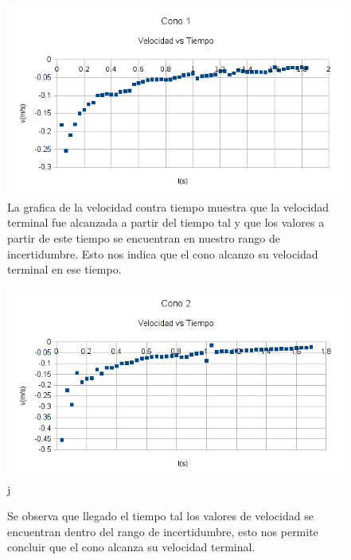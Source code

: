 \begin{figure}[h!]
    \centering
    \includegraphics{vel_cono1}
    \caption{La grafica de la velocidad contra tiempo muestra que la velocidad terminal
	fue alcanzada a partir del tiempo tal y que los valores a partir de este
	tiempo se encuentran en nuestro rango de incertidumbre. Esto nos indica que el
	cono alcanzo su velocidad terminal en ese tiempo.}
    \label{fig:VelCono1}
\end{figure}

\begin{figure}[h!]
    \centering
    \includegraphics{vel_cono2}j
    \caption{Se observa que llegado el tiempo tal los valores de velocidad se encuentran
	dentro del rango de incertidumbre, esto nos permite concluir que 
	el cono alcanza su velocidad terminal.}
    \label{fig:VelCono2}
\end{figure}

